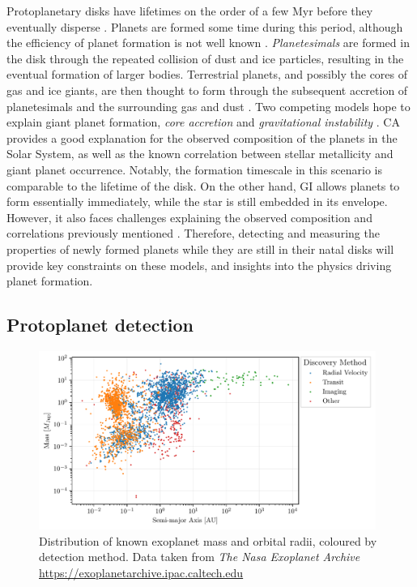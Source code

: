 Protoplanetary disks have lifetimes on the order of a few Myr before they eventually disperse \citep{mamajek2009}.
Planets are formed some time during this period, although the efficiency of planet formation is not well known \citep[see review by][]{helled2014a}.
\textit{Planetesimals} are formed in the disk through the repeated collision of dust and ice particles, resulting in the eventual formation of larger bodies.
Terrestrial planets, and possibly the cores of gas and ice giants, are then thought to form through the subsequent accretion of planetesimals and the surrounding gas and dust \citep[e.g.][]{johansen2014}.
Two competing models hope to explain giant planet formation, \textit{core accretion} \citep[CA;][]{safronov1972,lissauer1993,pollack1996} and \textit{gravitational instability} \citep[GI;][]{boss1997}.
CA provides a good explanation for the observed composition of the planets in the Solar System, as well as the known correlation between stellar metallicity and giant planet occurrence.
Notably, the formation timescale in this scenario is comparable to the lifetime of the disk.
On the other hand, GI allows planets to form essentially immediately, while the star is still embedded in its envelope.
However, it also faces challenges explaining the observed composition and correlations previously mentioned \citep[see review by][]{helled2014a}.
Therefore, detecting and measuring the properties of newly formed planets while they are still in their natal disks will provide key constraints on these models, and insights into the physics driving planet formation.

\subsection{Protoplanet detection}

\begin{figure}
    \centering
    \includegraphics[width = 0.98\textwidth]{figures/exoplanet.pdf}
    \caption{Distribution of known exoplanet mass and orbital radii, coloured by detection method. Data taken from \textit{The Nasa Exoplanet Archive} \url{https://exoplanetarchive.ipac.caltech.edu}}
    \label{fig:exoplanets}
\end{figure}

